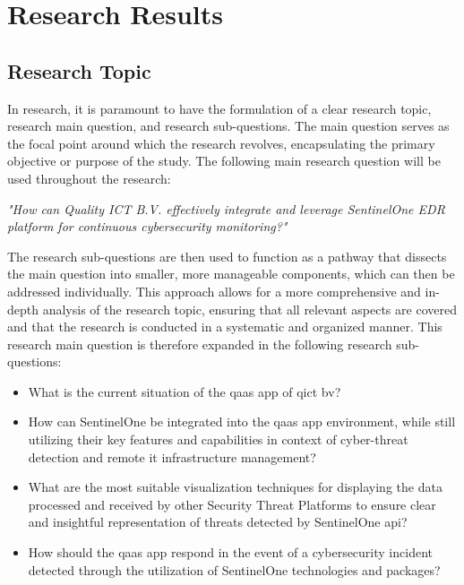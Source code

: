 \chapter{Research Results}
\begin{multicols}{2}
      \section{Research Topic}
      In research, it is paramount to have the formulation of a clear research topic, research main question,
      and research sub-questions. The main question serves as the focal point around which the research revolves,
      encapsulating the primary objective or purpose of the study.
      The following main research question will be used throughout the research:
      \begin{center}
            \textit{"How can Quality ICT B.V. effectively integrate and leverage SentinelOne EDR platform
                  for continuous cybersecurity monitoring?"}
      \end{center}
      The research sub-questions are then used to function as a pathway that dissects the main
      question into smaller, more manageable components, which can then be addressed individually. This approach
      allows for a more comprehensive and in-depth analysis of the research topic, ensuring that all relevant
      aspects are covered and that the research is conducted in a systematic and organized manner.
      This research main question is therefore expanded in the following research sub-questions:
      \begin{itemize}
            \item What is the current situation of the \acrshort{qaas} app of \acrlong{qict} \acrshort{bv}?
            \item How can SentinelOne be integrated into the \acrshort{qaas} app environment, while still
                  utilizing their key features and capabilities in context of cyber-threat detection and
                  remote \acrshort{it} infrastructure management?
            \item What are the most suitable visualization techniques for displaying the data processed and
                  received by other Security Threat Platforms to ensure clear and insightful representation
                  of threats detected by SentinelOne \acrshort{api}?
            \item How should the \acrshort{qaas} app respond in the event of a cybersecurity incident detected
                  through the utilization of SentinelOne technologies and packages?
      \end{itemize}

\end{multicols}
